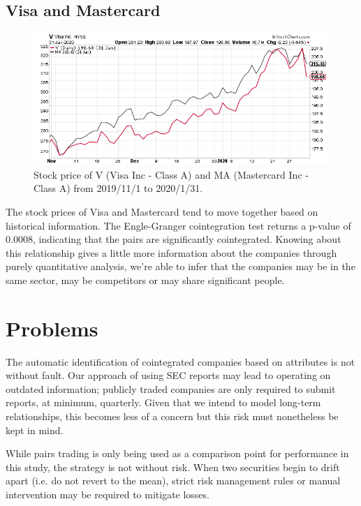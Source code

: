 \documentclass{UoYCSproject}
\begin{document}
\subsection{Visa and Mastercard}

\begin{figure}[h]
\begin{center}
\includegraphics[trim=0 0 0 15, clip, width=\linewidth]{"./images/VMA"}
\end{center}
\caption{Stock price of V (Visa Inc - Class A) and MA (Mastercard Inc - Class A) from 2019/11/1 to 2020/1/31.}
\end{figure}

The stock prices of Visa and Mastercard tend to move together based on historical information. The Engle-Granger cointegration test returns a p-value of 0.0008, indicating that the pairs are significantly cointegrated. Knowing about this relationship gives a little more information about the companies through purely quantitative analysis, we're able to infer that the companies may be in the same sector, may be competitors or may share significant people.

\section{Problems}

The automatic identification of cointegrated companies based on attributes is not without fault. Our approach of using SEC reports may lead to operating on outdated information; publicly traded companies are only required to submit reports, at minimum, quarterly. Given that we intend to model long-term relationships, this becomes less of a concern but this risk must nonetheless be kept in mind.

While pairs trading is only being used as a comparison point for performance in this study, the strategy is not without risk. When two securities begin to drift apart (i.e. do not revert to the mean), strict risk management rules or manual intervention may be required to mitigate losses.
\end{document}
